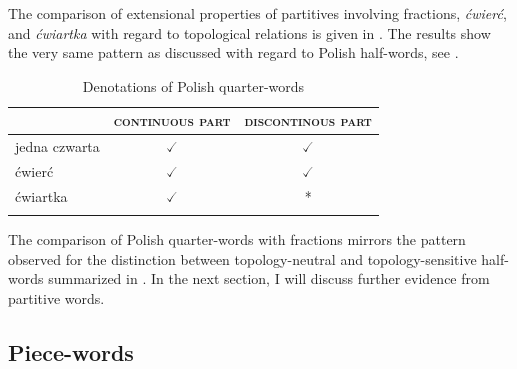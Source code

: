 The comparison of extensional properties of partitives involving fractions, \textit{ćwierć}, and \textit{ćwiartka} with regard to topological relations is given in . The results show the very same pattern as discussed with regard to Polish half-words, see .

\begin{table}[h]
			\centering
			\begin{tabular}{lcc}
				\lsptoprule
				& \textsc{continuous part} & \textsc{discontinous part} \\ \midrule
                jedna czwarta     & $\checked$    & $\checked$      \\				
                ćwierć     & $\checked$    & $\checked$      \\
				ćwiartka & $\checked$    & *                 \\ \lspbottomrule
			\end{tabular}
			\caption{Denotations of Polish quarter-words}\label{tab:denotations-of-polish-quarter-words}
		\end{table}

The comparison of Polish quarter-words with fractions mirrors the pattern observed for the distinction between topology-neutral and topology-sensitive half-words summarized in . In the next section, I will discuss further evidence from partitive words.

\subsection{Piece-words}\label{sec:piece-words}

